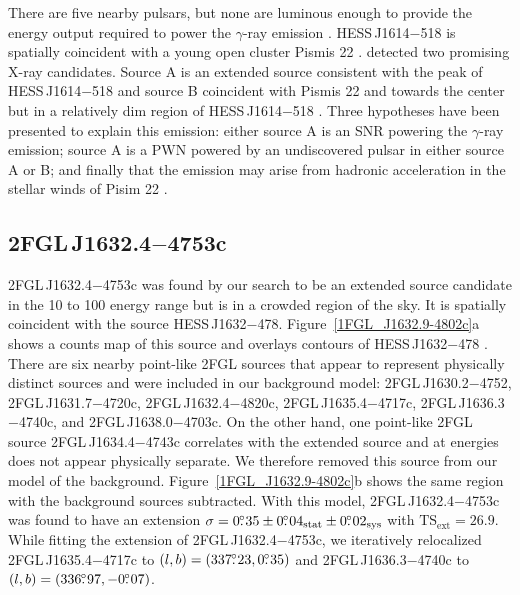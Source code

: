 \documentclass[12pt,preprint]{aastex}
\newcommand{\gev}{\text{GeV}\xspace}
\newcommand{\tev}{\text{TeV}\xspace}
\newcommand{\tsext}{{\ensuremath{\text{TS}_{\text{ext}}}}\xspace}
\newcommand{\suzaku}{\text{{\em Suzaku}}\xspace}
\newcommand{\sys}{\text{sys}\xspace}
\newcommand{\stat}{\text{stat}\xspace}
\begin{document}
There are five nearby pulsars, but none are luminous enough to
provide the energy output required to power the $\gamma$-ray
emission \citep{closer_look_hess_j1614-518}.  HESS\,J1614$-$518
is spatially coincident with a young open cluster Pismis 22
\citep{hess_1614_landi_atel,closer_look_hess_j1614-518}.  \suzaku detected
two promising X-ray candidates. Source A is an extended source consistent
with the peak of HESS\,J1614$-$518 and source B coincident with Pismis 22
and towards the center but in a relatively dim region of HESS\,J1614$-$518
\citep{suazku_hess_j1614_518}.  Three hypotheses have been presented to
explain this emission: either source A is an SNR powering the $\gamma$-ray
emission; source A is a PWN powered by an undiscovered pulsar in either
source A or B; and finally that the emission may arise from hadronic
acceleration in the stellar winds of Pisim 22 \citep{cangaroo_j1614-518}.

\subsection{2FGL\,J1632.4$-$4753c}
\label{section_2FGL_J1632.4-4753c}




2FGL\,J1632.4$-$4753c was found by our search to be an extended source
candidate in the 10 \gev to 100 \gev energy range but is in a crowded
region of the sky.  It is spatially coincident with the \tev source
HESS\,J1632$-$478.  Figure~\ref{1FGL_J1632.9-4802c}a shows a counts
map of this source and overlays \tev contours of HESS\,J1632$-$478
\citep{hess_plane_survey}.  There are six nearby point-like 2FGL
sources that appear to  represent physically distinct sources
and were included in our background model: 2FGL\,J1630.2$-$4752, 2FGL\,J1631.7$-$4720c, 2FGL\,J1632.4$-$4820c, 2FGL\,J1635.4$-$4717c,
2FGL\,J1636.3$-$4740c, and
2FGL\,J1638.0$-$4703c. On the
other hand, one point-like 2FGL source 2FGL\,J1634.4$-$4743c  correlates
with the extended \tev source and at \gev energies does
not appear physically separate. 
We therefore removed this source from our model of the
background.  Figure~\ref{1FGL_J1632.9-4802c}b shows the same region with
the background sources subtracted.  With this model, 2FGL\,J1632.4$-$4753c
was found to have an extension $\sigma=0\fdg35\pm0\fdg04_\stat\pm0\fdg02_\sys$
with $\tsext=26.9$.  While fitting the
extension of 2FGL\,J1632.4$-$4753c, we iteratively relocalized
2FGL\,J1635.4$-$4717c to $(l,b)=(337\mbox{$.\!\!^\circ$}23,0\mbox{$.\!\!^\circ$}35)$ and
2FGL\,J1636.3$-$4740c to $(l,b)=(336\mbox{$.\!\!^\circ$}97,-0\mbox{$.\!\!^\circ$}07)$.
\end{document}
